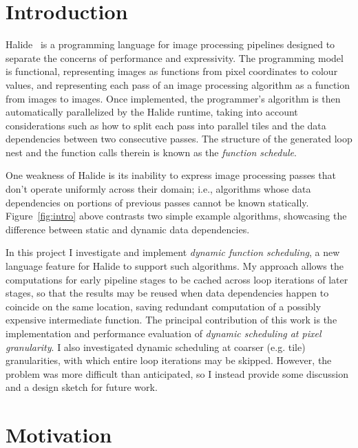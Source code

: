 \documentclass{article}
\begin{document}
\section{Introduction}

Halide~\cite{halide} is a programming language for image processing pipelines designed to separate the concerns of performance and expressivity. The programming model is functional, representing images as functions from pixel coordinates to colour values, and representing each pass of an image processing algorithm as a function from images to images. Once implemented, the programmer's algorithm is then automatically parallelized by the Halide runtime, taking into account considerations such as how to split each pass into parallel tiles and the data dependencies between two consecutive passes.
The structure of the generated loop nest and the function calls therein is known as the {\em function schedule}.

One weakness of Halide is its inability to express image processing passes that don't operate uniformly across their domain; i.e., algorithms whose data dependencies on portions of previous passes cannot be known statically. 
Figure~\ref{fig:intro} above contrasts two simple example algorithms, showcasing the difference between static and dynamic data dependencies.

In this project I investigate and implement {\em dynamic function scheduling}, a new language feature for Halide to support such algorithms.
My approach allows the computations for early pipeline stages to be cached across loop iterations of later stages, so that the results may be reused when data dependencies happen to coincide on the same location, saving redundant computation of a possibly expensive intermediate function.
The principal contribution of this work is the implementation and performance evaluation of {\em dynamic scheduling at pixel granularity}. I also investigated dynamic scheduling at coarser (e.g. tile) granularities, with which entire loop iterations may be skipped. However, the problem was more difficult than anticipated, so I instead provide some discussion and a design sketch for future work.

\section{Motivation}
\end{document}
